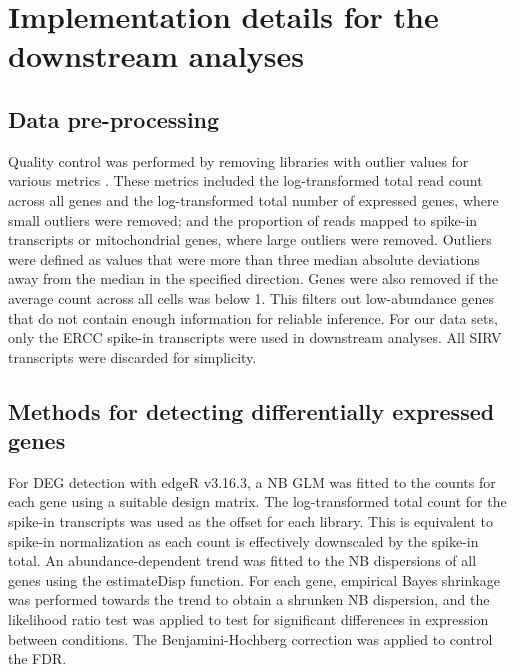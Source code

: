 \documentclass{article}
\begin{document}
\section{Implementation details for the downstream analyses}

\subsection{Data pre-processing}
Quality control was performed by removing libraries with outlier values for various metrics \citep{lun2016stepbystep}.
These metrics included the log-transformed total read count across all genes and the log-transformed total number of expressed genes, where small outliers were removed; 
and the proportion of reads mapped to spike-in transcripts or mitochondrial genes, where large outliers were removed.
Outliers were defined as values that were more than three median absolute deviations away from the median in the specified direction.
Genes were also removed if the average count across all cells was below 1.
This filters out low-abundance genes that do not contain enough information for reliable inference.
For our data sets, only the ERCC spike-in transcripts were used in downstream analyses.
All SIRV transcripts were discarded for simplicity.

\subsection{Methods for detecting differentially expressed genes}
For DEG detection with edgeR v3.16.3, a NB GLM was fitted to the counts for each gene \citep{mccarthy2012differential} using a suitable design matrix.
The log-transformed total count for the spike-in transcripts was used as the offset for each library.
This is equivalent to spike-in normalization as each count is effectively downscaled by the spike-in total.
An abundance-dependent trend was fitted to the NB dispersions of all genes using the estimateDisp function.
For each gene, empirical Bayes shrinkage was performed towards the trend to obtain a shrunken NB dispersion, and the likelihood ratio test was applied to test for significant differences in expression between conditions.
The Benjamini-Hochberg correction was applied to control the FDR.
\end{document}
